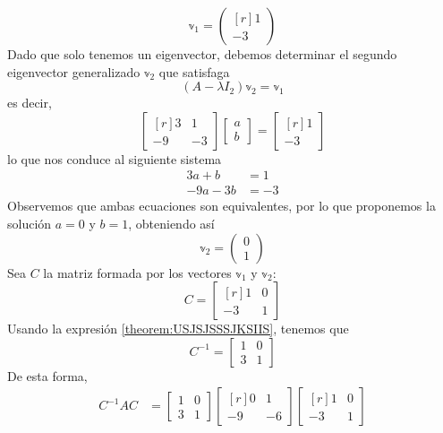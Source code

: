\begin{example}
    $$\mathbb{v}_1 = \begin{pmatrix*}[r]
        1 \\
        -3
    \end{pmatrix*}$$\newpage\noindent
    Dado que solo tenemos un eigenvector, debemos determinar el segundo eigenvector generalizado $\mathbb{v}_2$ que satisfaga
    $$(A - \lambda I_2)\mathbb{v}_2 = \mathbb{v}_1$$
    es decir,
    $$\begin{bmatrix*}[r]
        3 & 1 \\
        -9 & -3
    \end{bmatrix*} \begin{bmatrix}
        a \\
        b
    \end{bmatrix} = \begin{bmatrix*}[r]
        1 \\
        -3
    \end{bmatrix*}$$
    lo que nos conduce al siguiente sistema
    \begin{align*}
        3a + b & = 1 \\
        -9a - 3b & = -3
    \end{align*}
    Observemos que ambas ecuaciones son equivalentes, por lo que proponemos la solución $a = 0$ y $b = 1$, obteniendo así
    $$\mathbb{v}_2 = \begin{pmatrix*} 0 \\ 1 \end{pmatrix*}$$
    Sea $C$ la matriz formada por los vectores $\mathbb{v}_1$ y $\mathbb{v}_2$:
    $$C = \begin{bmatrix*}[r] 1 & 0 \\ -3 & 1 \end{bmatrix*}$$
    Usando la expresión \ref{theorem:USJSJSSSJKSIIS}, tenemos que
    $$C^{-1} = \begin{bmatrix} 1 & 0 \\ 3 & 1 \end{bmatrix}$$
    De esta forma,
    \begin{align*}
        C^{-1}AC & = \begin{bmatrix} 1 & 0 \\ 3 & 1 \end{bmatrix} \begin{bmatrix*}[r]
            0 & 1 \\
            -9 & -6
        \end{bmatrix*} \begin{bmatrix*}[r] 1 & 0 \\ -3 & 1 \end{bmatrix*} \\

\end{align*}
\end{example}
